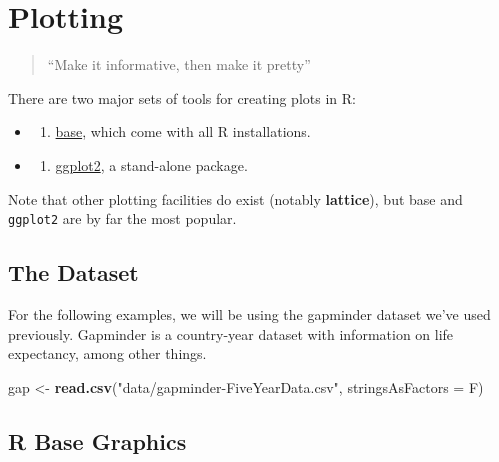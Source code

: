 \documentclass[]{book}
\newenvironment{Shaded}{\begin{snugshade}}{\end{snugshade}}
\newcommand{\DataTypeTok}[1]{\textcolor[rgb]{0.13,0.29,0.53}{#1}}
\newcommand{\KeywordTok}[1]{\textcolor[rgb]{0.13,0.29,0.53}{\textbf{#1}}}
\newcommand{\NormalTok}[1]{#1}
\newcommand{\StringTok}[1]{\textcolor[rgb]{0.31,0.60,0.02}{#1}}
\providecommand{\tightlist}{%
  \setlength{\itemsep}{0pt}\setlength{\parskip}{0pt}}
\begin{document}
\hypertarget{plotting}{%
\chapter{Plotting}\label{plotting}}

\begin{quote}
``Make it informative, then make it pretty''
\end{quote}

There are two major sets of tools for creating plots in R:

\begin{itemize}
\item
  \begin{enumerate}
  \def\labelenumi{\arabic{enumi}.}
  \tightlist
  \item
    \protect\hyperlink{1-r-base-graphics}{base}, which come with all R installations.
  \end{enumerate}
\item
  \begin{enumerate}
  \def\labelenumi{\arabic{enumi}.}
  \setcounter{enumi}{1}
  \tightlist
  \item
    \protect\hyperlink{2-ggplot2}{ggplot2}, a stand-alone package.
  \end{enumerate}
\end{itemize}

Note that other plotting facilities do exist (notably \textbf{lattice}), but base and \texttt{ggplot2} are by far the most popular.

\hypertarget{the-dataset}{%
\section{The Dataset}\label{the-dataset}}

For the following examples, we will be using the gapminder dataset we've used previously. Gapminder is a country-year dataset with information on life expectancy, among other things.

\begin{Shaded}
\begin{Highlighting}[]
\NormalTok{gap <-}\StringTok{ }\KeywordTok{read.csv}\NormalTok{(}\StringTok{"data/gapminder-FiveYearData.csv"}\NormalTok{, }\DataTypeTok{stringsAsFactors =}\NormalTok{ F)}
\end{Highlighting}
\end{Shaded}

\hypertarget{r-base-graphics}{%
\section{R Base Graphics}\label{r-base-graphics}}
\end{document}
